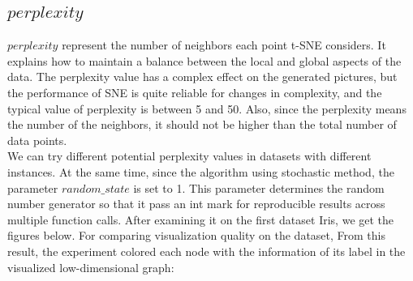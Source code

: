 \subsection{$perplexity$}

\noindent $perplexity$ represent the number of neighbors each point t-SNE considers. It explains how to maintain a balance between the local and global aspects of the data. The perplexity value has a complex effect on the generated pictures, but the performance of SNE is quite reliable for changes in complexity, and the typical value of perplexity is between 5 and 50\cite{ref9}. Also, since the perplexity means the number of the neighbors, it should not be higher than the total number of data points.\\

\noindent We can try different potential perplexity values in datasets with different instances. At the same time, since the algorithm using stochastic method, the parameter $random\_state$ is set to 1. This parameter determines the random number generator so that it pass an int mark for reproducible results across multiple function calls. After examining it on the first dataset Iris, we get the figures below. For comparing visualization quality on the dataset, From this result, the experiment colored each node with the information of its label in the visualized low-dimensional graph:

